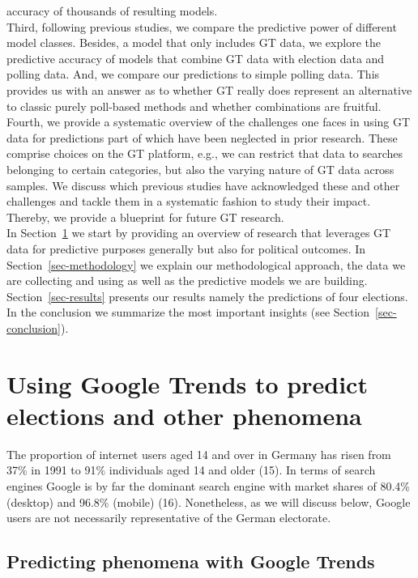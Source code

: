 \documentclass[
  letterpaper,
  DIV=11,
  numbers=noendperiod]{scrartcl}
\begin{document}
accuracy of thousands of resulting models.\\
Third, following previous studies, we compare the predictive power of
different model classes. Besides, a model that only includes GT data, we
explore the predictive accuracy of models that combine GT data with
election data and polling data. And, we compare our predictions to
simple polling data. This provides us with an answer as to whether GT
really does represent an alternative to classic purely poll-based
methods and whether combinations are fruitful.\\
Fourth, we provide a systematic overview of the challenges one faces in
using GT data for predictions part of which have been neglected in prior
research. These comprise choices on the GT platform, e.g., we can
restrict that data to searches belonging to certain categories, but also
the varying nature of GT data across samples. We discuss which previous
studies have acknowledged these and other challenges and tackle them in
a systematic fashion to study their impact. Thereby, we provide a
blueprint for future GT research.\\
In Section~\ref{sec-review} we start by providing an overview of
research that leverages GT data for predictive purposes generally but
also for political outcomes. In Section~\ref{sec-methodology} we explain
our methodological approach, the data we are collecting and using as
well as the predictive models we are building. Section~\ref{sec-results}
presents our results namely the predictions of four elections. In the
conclusion we summarize the most important insights (see
Section~\ref{sec-conclusion}).

\hypertarget{sec-review}{%
\section{Using Google Trends to predict elections and other
phenomena}\label{sec-review}}

The proportion of internet users aged 14 and over in Germany has risen
from 37\% in 1991 to 91\% individuals aged 14 and older (15). In terms
of search engines Google is by far the dominant search engine with
market shares of 80.4\% (desktop) and 96.8\% (mobile) (16). Nonetheless,
as we will discuss below, Google users are not necessarily
representative of the German electorate.

\hypertarget{predicting-phenomena-with-google-trends}{%
\subsection{Predicting phenomena with Google
Trends}\label{predicting-phenomena-with-google-trends}}
\end{document}
